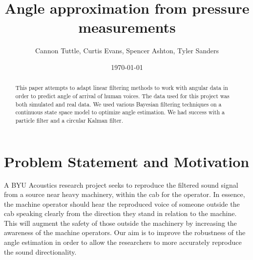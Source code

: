 \documentclass[11pt]{amsart}
\begin{document}
\title{Angle approximation from pressure measurements}
\author{Cannon Tuttle, Curtis Evans, Spencer Ashton, Tyler Sanders}

\date{\today}

\begin{abstract}
    This paper attempts to adapt linear filtering methods to work with angular data in order to predict angle of arrival of human voices. The data used for this 
    project was both simulated and real data. We used various Bayesian filtering techniques on a continuous state space model to optimize angle estimation. We had
    success with a particle filter and a circular Kalman filter.
\end{abstract}

\maketitle

\section{Problem Statement and Motivation}
A BYU Acoustics research project seeks to reproduce the filtered sound signal from a source near heavy machinery, within the cab for the operator. In essence, 
the machine operator should hear the reproduced voice of someone outside the cab speaking clearly from the direction they stand in relation to the machine. This 
will augment the safety of those outside the machinery by increasing the awareness of the machine operators. Our aim is to improve the robustness of the angle 
estimation in order to allow the researchers to more accurately reproduce the sound directionality.
\end{document}
